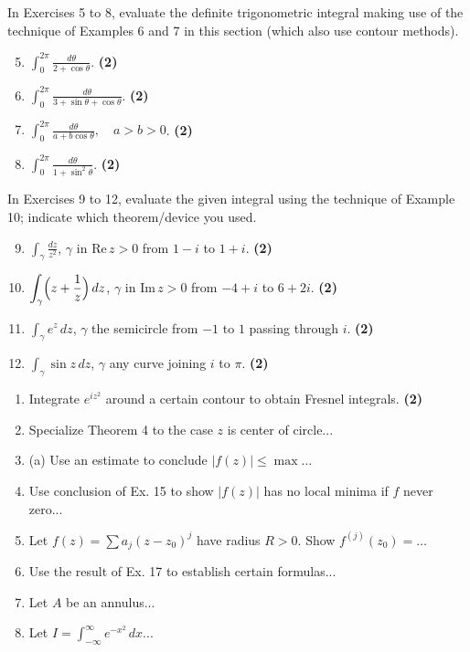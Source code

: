 \documentclass[12pt]{article}
\theoremstyle{definition} %
\theoremstyle{plain} %
\begin{document}
In Exercises 5 to 8, evaluate the definite trigonometric integral making use of the technique of Examples 6 and 7 in this section (which also use contour methods).
\begin{enumerate}
    \setcounter{enumi}{4}
    \item $\displaystyle \int_0^{2\pi} \frac{d\theta}{2 + \cos \theta}$. \quad \textbf{(2)}
    \item $\displaystyle \int_0^{2\pi} \frac{d\theta}{3 + \sin \theta + \cos \theta}$. \quad \textbf{(2)}
    \item $\displaystyle \int_0^{2\pi} \frac{d\theta}{a + b \cos \theta}, \quad a > b > 0$. \quad \textbf{(2)}
    \item $\displaystyle \int_0^{2\pi} \frac{d\theta}{1 + \sin^2 \theta}$. \quad \textbf{(2)}
\end{enumerate}

In Exercises 9 to 12, evaluate the given integral using the technique of Example 10; indicate which theorem/device you used.
\begin{enumerate}
    \setcounter{enumi}{8}
    \item $\displaystyle \int_\gamma \frac{dz}{z^2}$, $\gamma$ in $\text{Re}\, z > 0$ from $1 - i$ to $1 + i$. \quad \textbf{(2)}
    \item $\displaystyle \int_\gamma \Bigl(z + \frac{1}{z}\Bigr)\,dz$, $\gamma$ in $\text{Im}\,z>0$ from $-4+i$ to $6+2i$. \quad \textbf{(2)}
    \item $\displaystyle \int_\gamma e^z \, dz$, $\gamma$ the semicircle from $-1$ to $1$ passing through $i$. \quad \textbf{(2)}
    \item $\displaystyle \int_\gamma \sin z \, dz$, $\gamma$ any curve joining $i$ to $\pi$. \quad \textbf{(2)}
\end{enumerate}

\begin{enumerate}
    \item Integrate $e^{iz^2}$ around a certain contour to obtain Fresnel integrals. \quad \textbf{(2)}
    \item Specialize Theorem 4 to the case $z$ is center of circle...
    \item (a) Use an estimate to conclude $|f(z)| \le \max\ldots$ 
    \item Use conclusion of Ex. 15 to show $|f(z)|$ has no local minima if $f$ never zero...
    \item Let $f(z) = \sum a_j (z-z_0)^j$ have radius $R>0$. Show $f^{(j)}(z_0)=\dots$ 
    \item Use the result of Ex. 17 to establish certain formulas...
    \item Let $A$ be an annulus... 
    \item Let $I = \int_{-\infty}^\infty e^{-x^2}\,dx$...
\end{enumerate}
\end{document}
